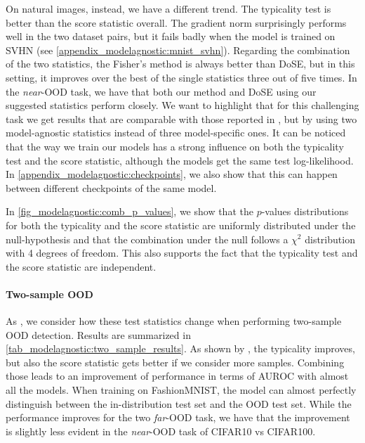 {On natural images, instead, we have a different trend. The typicality test is better than the score statistic overall. The gradient norm surprisingly performs well in the two dataset pairs, but it fails badly when the model is trained on SVHN (see \cref{appendix_modelagnostic:mnist_svhn}). Regarding the combination of the two statistics, the Fisher's method is always better than DoSE, but in this setting, it improves over the best of the single statistics three out of five times.
%
In the \textit{near}-OOD task, we have that both our method and DoSE using our suggested statistics perform closely. We want to highlight that for this challenging task we get results that are comparable with those reported in \textcite{morningstar_density_2021}, but by using two model-agnostic statistics instead of three model-specific ones.
%
It can be noticed that the way we train our models has a strong influence on both the typicality test and the score statistic, although the models get the same test log-likelihood. In \cref{appendix_modelagnostic:checkpoints}, we also show that this can happen between different checkpoints of the same model.

In \cref{fig_modelagnostic:comb_p_values}, we show that the $p$-values distributions for both the typicality and the score statistic are uniformly distributed under the null-hypothesis and that the combination under the null follows a $\chi^2$ distribution with 4 degrees of freedom. This also supports the fact that the typicality test and the score statistic are independent.

\paragraph{Two-sample OOD}
As \textcite{nalisnick_detecting_2019}, we consider how these test statistics change when performing two-sample OOD detection. Results are summarized in \cref{tab_modelagnostic:two_sample_results}. As shown by \textcite{nalisnick_detecting_2019}, the typicality improves, but also the score statistic gets better if we consider more samples. Combining those leads to an improvement of performance in terms of AUROC with almost all the models. When training on FashionMNIST, the model can almost perfectly distinguish between the in-distribution test set and the OOD test set. While the performance improves for the two \textit{far}-OOD task, we have that the improvement is slightly less evident in the \textit{near}-OOD task of CIFAR10 vs CIFAR100.

}
